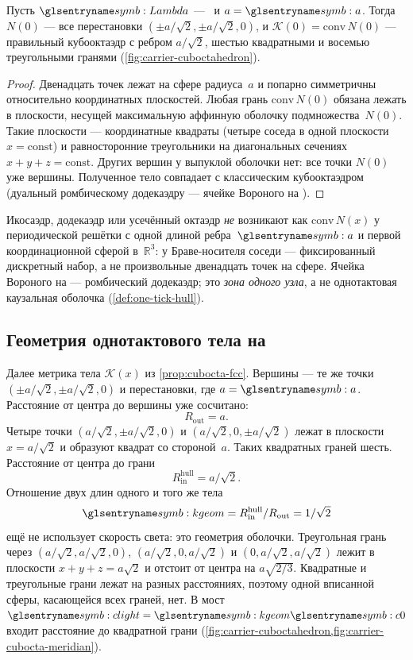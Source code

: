 \begin{proposition}
\label{prop:cubocta-fcc}
Пусть $\carrierLattice$ --- \latGCK\ и $a=\caStepSpace$.
Тогда $N(0)$ --- все перестановки $(\pm a/\sqrt{2},\pm a/\sqrt{2},0)$,
и $\mathcal{K}(0)=\mathrm{conv}\,N(0)$ --- правильный кубооктаэдр с ребром $a/\sqrt{2}$,
шестью квадратными и восемью треугольными гранями (\cref{fig:carrier-cuboctahedron}).
\end{proposition}

\begin{proof}
Двенадцать точек лежат на сфере радиуса~$a$ и попарно симметричны относительно координатных плоскостей.
Любая грань $\mathrm{conv}\,N(0)$ обязана лежать в плоскости, несущей максимальную аффинную оболочку подмножества~$N(0)$.
Такие плоскости --- координатные квадраты (четыре соседа в одной плоскости $x=\mathrm{const}$)
и равносторонние треугольники на диагональных сечениях $x+y+z=\mathrm{const}$.
Других вершин у выпуклой оболочки нет: все точки $N(0)$ уже вершины.
Полученное тело совпадает с классическим кубооктаэдром (дуальный ромбическому додекаэдру --- ячейке Вороного на \latGCKshort).
\end{proof}

\begin{remark}
Икосаэдр, додекаэдр или усечённый октаэдр \emph{не} возникают как $\mathrm{conv}\,N(x)$ у периодической решётки
с одной длиной ребра~$\caStepSpace$ и первой координационной сферой в~$\mathbb{R}^3$:
у Браве-носителя соседи --- фиксированный дискретный набор, а не произвольные двенадцать точек на сфере.
Ячейка Вороного на \latGCKshort --- ромбический додекаэдр; это \emph{зона одного узла}, а не однотактовая каузальная оболочка (\cref{def:one-tick-hull}).
\end{remark}

\subsection{Геометрия однотактового тела на \latGCKshort}
\label{sec:fcc-kappa}

Далее метрика тела $\mathcal{K}(x)$ из \cref{prop:cubocta-fcc}.
Вершины --- те же точки $(\pm a/\sqrt{2},\pm a/\sqrt{2},0)$ и перестановки, где $a=\caStepSpace$.
Расстояние от центра до вершины уже сосчитано:
\[
  R_{\mathrm{out}}=a.
\]
Четыре точки $(a/\sqrt{2},\pm a/\sqrt{2},0)$ и $(a/\sqrt{2},0,\pm a/\sqrt{2})$ лежат в плоскости $x=a/\sqrt{2}$ и образуют квадрат со стороной~$a$.
Таких квадратных граней шесть.
Расстояние от центра до грани
\[
  R_{\mathrm{in}}^{\mathrm{hull}}=a/\sqrt{2}.
\]
Отношение двух длин одного и того же тела
\[
  \caKappaGeom=R_{\mathrm{in}}^{\mathrm{hull}}/R_{\mathrm{out}}=1/\sqrt{2}
\]
ещё не использует скорость света: это геометрия оболочки.
Треугольная грань через $(a/\sqrt{2},a/\sqrt{2},0)$, $(a/\sqrt{2},0,a/\sqrt{2})$ и $(0,a/\sqrt{2},a/\sqrt{2})$ лежит в плоскости $x+y+z=a\sqrt{2}$ и отстоит от центра на $a\sqrt{2/3}$.
Квадратные и треугольные грани лежат на разных расстояниях, поэтому одной вписанной сферы, касающейся всех граней, нет.
В мост $\speedC=\caKappaGeom \caSignalSpeed$ входит расстояние до квадратной грани
(\cref{fig:carrier-cuboctahedron,fig:carrier-cubocta-meridian}).

